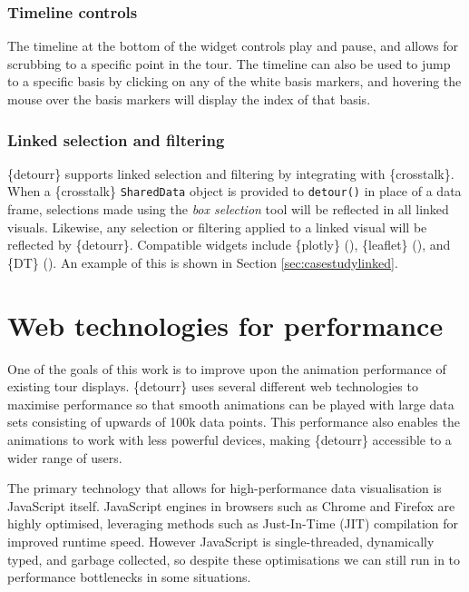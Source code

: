\hypertarget{timeline-controls}{%
\subsubsection{Timeline controls}\label{timeline-controls}}

The timeline at the bottom of the widget controls play and pause, and
allows for scrubbing to a specific point in the tour. The timeline can
also be used to jump to a specific basis by clicking on any of the white
basis markers, and hovering the mouse over the basis markers will
display the index of that basis.

\hypertarget{linked-selection-and-filtering}{%
\subsubsection{Linked selection and
filtering}\label{linked-selection-and-filtering}}

\{detourr\} supports linked selection and filtering by integrating with
\{crosstalk\}. When a \{crosstalk\} \texttt{SharedData} object is
provided to \texttt{detour()} in place of a data frame, selections made
using the \emph{box selection} tool will be reflected in all linked
visuals. Likewise, any selection or filtering applied to a linked visual
will be reflected by \{detourr\}. Compatible widgets include \{plotly\}
(\citet{plotly}), \{leaflet\} (\citet{leaflet}), and \{DT\}
(\citet{dt}). An example of this is shown in Section
\ref{sec:casestudylinked}.

\pagebreak

\hypertarget{ch:webtechnologies}{%
\section{Web technologies for performance}\label{ch:webtechnologies}}

One of the goals of this work is to improve upon the animation
performance of existing tour displays. \{detourr\} uses several
different web technologies to maximise performance so that smooth
animations can be played with large data sets consisting of upwards of
100k data points. This performance also enables the animations to work
with less powerful devices, making \{detourr\} accessible to a wider
range of users.

The primary technology that allows for high-performance data
visualisation is JavaScript itself. JavaScript engines in browsers such
as Chrome and Firefox are highly optimised, leveraging methods such as
Just-In-Time (JIT) compilation for improved runtime speed. However
JavaScript is single-threaded, dynamically typed, and garbage collected,
so despite these optimisations we can still run in to performance
bottlenecks in some situations.

